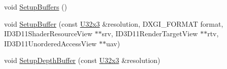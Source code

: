 \begin{DoxyCompactItemize}
void \mbox{\hyperlink{classmage_1_1rendering_1_1_output_manager_a590172441d291329d1f5a9dbbdb71320}{Setup\+Buffers}} ()
\item 
void \mbox{\hyperlink{classmage_1_1rendering_1_1_output_manager_aca32d0307be3acfaa8f5a20fa24b6934}{Setup\+Buffer}} (const \mbox{\hyperlink{namespacemage_a1e9348414b777b1a460dc4f295bc87fc}{U32x3}} \&resolution, D\+X\+G\+I\+\_\+\+F\+O\+R\+M\+AT format, I\+D3\+D11\+Shader\+Resource\+View $\ast$$\ast$srv, I\+D3\+D11\+Render\+Target\+View $\ast$$\ast$rtv, I\+D3\+D11\+Unordered\+Access\+View $\ast$$\ast$uav)
\item 
void \mbox{\hyperlink{classmage_1_1rendering_1_1_output_manager_a4cbd2dd771206b15d934657205475ae1}{Setup\+Depth\+Buffer}} (const \mbox{\hyperlink{namespacemage_a1e9348414b777b1a460dc4f295bc87fc}{U32x3}} \&resolution)
\end{DoxyCompactItemize}
